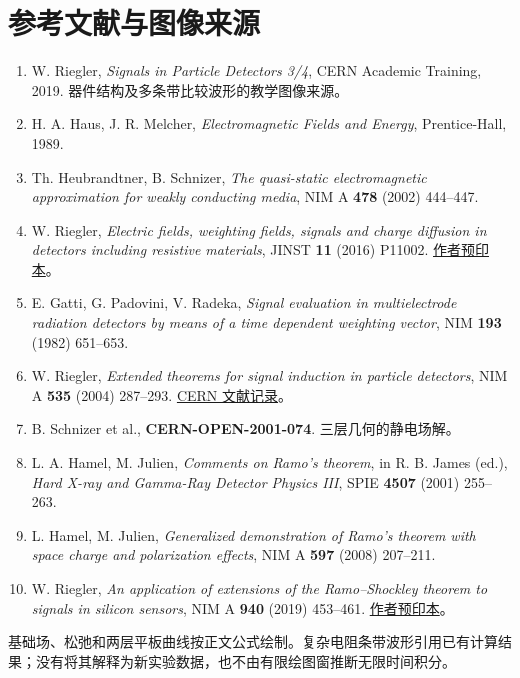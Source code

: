 \documentclass[
  11pt,
  a4paper,
  oneside,
  openany]{report}
\providecommand{\tightlist}{%
  \setlength{\itemsep}{0pt}\setlength{\parskip}{0pt}}
\numberwithin{equation}{chapter}
\begin{document}
\chapter{参考文献与图像来源}\label{ux53c2ux8003ux6587ux732eux4e0eux56feux50cfux6765ux6e90}

\begin{enumerate}
\def\labelenumi{\arabic{enumi}.}
\tightlist
\item
  W. Riegler, \emph{Signals in Particle Detectors 3/4}, CERN Academic
  Training, 2019. 器件结构及多条带比较波形的教学图像来源。
\item
  H. A. Haus, J. R. Melcher, \emph{Electromagnetic Fields and Energy},
  Prentice-Hall, 1989.
\item
  Th. Heubrandtner, B. Schnizer, \emph{The quasi-static electromagnetic
  approximation for weakly conducting media}, NIM A \textbf{478} (2002)
  444--447.
\item
  W. Riegler, \emph{Electric fields, weighting fields, signals and
  charge diffusion in detectors including resistive materials}, JINST
  \textbf{11} (2016) P11002.
  \href{https://arxiv.org/abs/1602.07949}{作者预印本}。
\item
  E. Gatti, G. Padovini, V. Radeka, \emph{Signal evaluation in
  multielectrode radiation detectors by means of a time dependent
  weighting vector}, NIM \textbf{193} (1982) 651--653.
\item
  W. Riegler, \emph{Extended theorems for signal induction in particle
  detectors}, NIM A \textbf{535} (2004) 287--293.
  \href{https://cds.cern.ch/record/903045}{CERN 文献记录}。
\item
  B. Schnizer et al., \textbf{CERN-OPEN-2001-074}. 三层几何的静电场解。
\item
  L. A. Hamel, M. Julien, \emph{Comments on Ramo's theorem}, in R. B.
  James (ed.), \emph{Hard X-ray and Gamma-Ray Detector Physics III},
  SPIE \textbf{4507} (2001) 255--263.
\item
  L. Hamel, M. Julien, \emph{Generalized demonstration of Ramo's theorem
  with space charge and polarization effects}, NIM A \textbf{597} (2008)
  207--211.
\item
  W. Riegler, \emph{An application of extensions of the Ramo--Shockley
  theorem to signals in silicon sensors}, NIM A \textbf{940} (2019)
  453--461. \href{https://arxiv.org/abs/1812.07570}{作者预印本}。
\end{enumerate}

基础场、松弛和两层平板曲线按正文公式绘制。复杂电阻条带波形引用已有计算结果；没有将其解释为新实验数据，也不由有限绘图窗推断无限时间积分。
\end{document}
